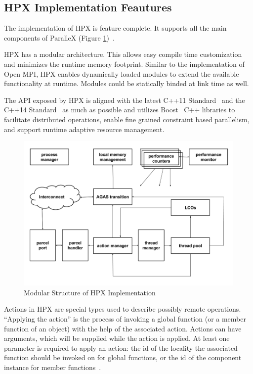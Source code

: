 \subsection{HPX Implementation Feautures}

The implementation of HPX is feature complete. It supports all the main components of ParalleX (Figure \ref{fig:hpx-structure})~\cite{anderson2013tabulated}.

HPX has a modular architecture. This allows easy compile time customization and minimizes the runtime memory footprint. Similar to the implementation of Open MPI, HPX enables dynamically loaded modules to extend the available functionality at runtime. Modules could be statically binded at link time as well.

The API exposed by HPX is aligned with the latest C++11 Standard~\cite{c++11} and the C++14 Standard~\cite{c++14} as much as possible and utilizes Boost~\cite{dawes2009boost} C++ libraries to facilitate distributed operations, enable fine grained constraint based parallelism, and support runtime adaptive resource management\cite{kaiser2014hpx}.

\begin{figure}[ht]
\centering
\includegraphics[scale=0.47]{images/hpx.png}
\caption[Modular Structure of HPX Implementation]{Modular Structure of HPX Implementation}
\label{fig:hpx-structure}
\end{figure}

Actions in HPX are special types used to describe possibly remote operations. ``Applying the action'' is the process of invoking a global function (or a member function of an object) with the help of the associated action. Actions can have arguments, which will be supplied while the action is applied. At least one parameter is required to apply an action: the id of the locality the associated function should be invoked on for global functions, or the id of the component instance for member functions~\cite{ghimire2014data}.

